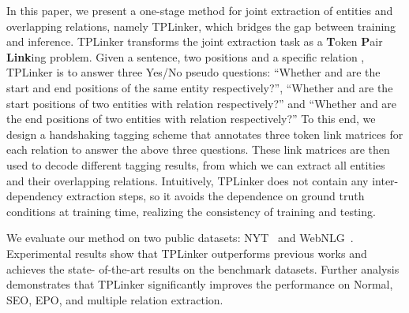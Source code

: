 \documentclass[11pt]{article}
\begin{document}
In this paper, we present a one-stage method for joint extraction of entities and overlapping relations, namely TPLinker, which bridges the gap between training and inference.
TPLinker transforms the joint extraction task as a \textbf{T}oken \textbf{P}air \textbf{Link}ing problem.
Given a sentence, two positions  and a specific relation , TPLinker is to answer three Yes/No pseudo questions: ``Whether  and  are the start and end positions of the same entity respectively?'', ``Whether  and  are the start positions of two entities with  relation respectively?'' and ``Whether  and  are the end positions of two entities with  relation respectively?''
To this end, we design a handshaking tagging scheme that annotates three token link matrices for each relation to answer the above three questions.
These link matrices are then used to decode different tagging results, from which we can extract all entities and their overlapping relations. 
Intuitively, TPLinker does not contain any inter-dependency extraction steps,  so it avoids the dependence on ground truth conditions at training time, realizing the consistency of training and testing.

We evaluate our method on two public datasets: NYT~\cite{riedel2010modeling} and WebNLG~\cite{gardent2017creating}. 
Experimental results show that TPLinker outperforms previous works and achieves the state- of-the-art results on the benchmark datasets.
Further analysis demonstrates that TPLinker significantly improves the performance on Normal, SEO, EPO, and multiple relation extraction.
\end{document}
